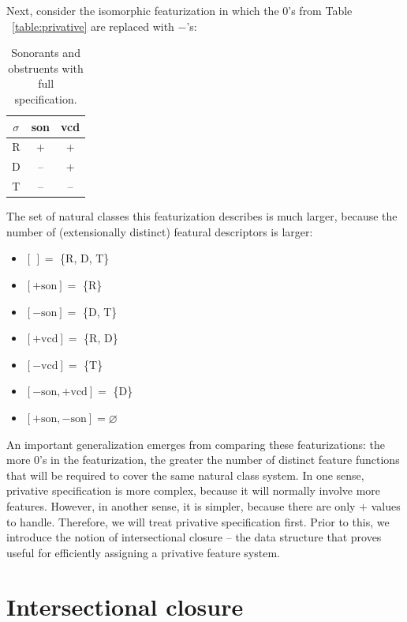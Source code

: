 \documentclass[11pt, oneside]{article}   	%
\begin{document}
Next, consider the isomorphic featurization in which the $0$'s from Table ~\ref{table:privative} are replaced with $-$'s:

\begin{table}[h]
    \centering
    \begin{tabular} {|c||c|c|}
    \hline
        $\sigma$ & son & vcd \\ \hline
        R & + & + \\
        D & -- & + \\
        T & -- & -- \\
        \hline
    \end{tabular}
    \caption{Sonorants and obstruents with full specification.}
    \label{table:full}
\end{table}

\noindent The set of natural classes this featurization describes is much larger, because the number of (extensionally distinct) featural descriptors is larger: \begin{itemize}
    \item $[\,] =$ \{R, D, T\}
    \item $[+\text{son}] =$ \{R\}
    \item $[-\text{son}] =$ \{D, T\}
    \item $[+\text{vcd}] =$ \{R, D\}
    \item $[-\text{vcd}] =$ \{T\}
    \item $[-\text{son},+\text{vcd}] =$ \{D\}
    \item $[+\text{son},-\text{son}] = \varnothing$
    \end{itemize}

\noindent An important generalization emerges from comparing these featurizations: the more $0$'s in the featurization, the greater the number of distinct feature functions that will be required to cover the same natural class system. In one sense, privative specification is more complex, because it will normally involve more features. However, in another sense, it is simpler, because there are only $+$ values to handle. Therefore, we will treat privative specification first. Prior to this, we introduce the notion of intersectional closure -- the data structure that proves useful for efficiently assigning a privative feature system.

\section{Intersectional closure}
\end{document}
